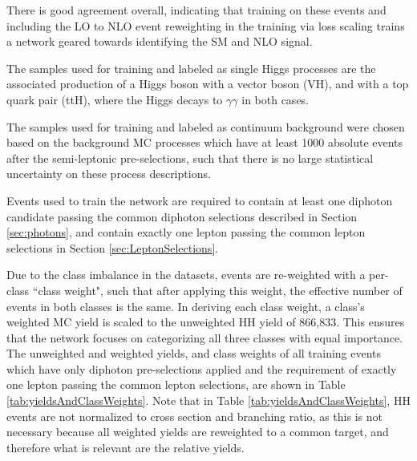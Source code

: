There is good agreement overall, indicating that training on these events and including the LO to NLO event reweighting in the training via loss scaling trains a network geared towards identifying the SM and NLO signal.

The samples used for training and labeled as single Higgs processes are the associated production of a Higgs boson with a vector boson (VH), and with a top quark pair (ttH), where the Higgs decays to $\gamma\gamma$ in both cases. 

The samples used for training and labeled as continuum background were chosen based on the background MC processes which have at least 1000 absolute events after the semi-leptonic pre-selections, such that there is no large statistical uncertainty on these process descriptions. 

Events used to train the network are required to contain at least one diphoton candidate passing the common diphoton selections described in Section \ref{sec:photons},
and contain exactly one lepton passing the common lepton selections in Section \ref{sec:LeptonSelections}.

Due to the class imbalance in the datasets, events are re-weighted with a per-class ``class weight", such that after applying this weight, the effective number 
of events in both classes is the same. In deriving each class weight, a class's weighted MC yield is scaled to the unweighted HH yield of 866,833. This ensures that the network focuses on categorizing all three classes with equal importance. The unweighted and weighted yields, 
and class weights of all training events which have only diphoton pre-selections applied and the requirement of exactly one lepton passing the common lepton selections, 
are shown in Table \ref{tab:yieldsAndClassWeights}. Note that 
in Table \ref{tab:yieldsAndClassWeights}, HH events are not normalized to cross section and branching ratio,
as this is not necessary because all weighted yields are reweighted to a common target, and therefore what is relevant are the relative yields. 

\begin{figure}[H]
        
\end{figure}

